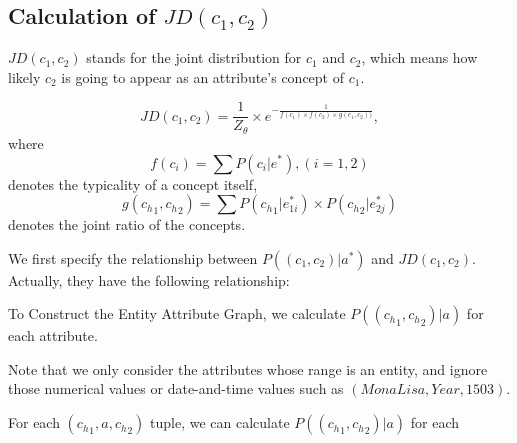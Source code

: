 



\subsection{ Calculation of $JD(c_1,c_2)$}


$JD(c_1,c_2)$ stands for the joint distribution for $c_1$ and $c_2$, which means how likely $c_2$ is going to appear as an attribute's concept of $c_1$.

\begin{definition}[Definition of $JD(c_1,c_2)$]

  $$ JD(c_1,c_2) = \frac{1}{Z_\theta}\times e^{- \frac{1}{f(c_1)\times f(c_2)\times g(c_1,c_2))}},$$
  where $$f(c_i)=\sum{ P(c_i|e^*) },(i=1,2)$$
  denotes the typicality of a concept itself, $$g({c_h}_1 ,{c_h}_2 )=\sum P({c_h}_{1}|e_{1i}^*) \times P({c_h}_{2}|e_{2j}^*)$$
  denotes the joint ratio of the concepts.


\end{definition}





We first specify the relationship between $P((c_{1},c_{2})|a^*) $ and $JD(c_1,c_2)$. Actually, they have the following relationship:
\xch{===========================}



To Construct the Entity Attribute Graph, we calculate $P(({c_h}_{1},{c_h}_{2}) |a)$ for each attribute.




Note that we only consider the attributes whose range is an entity, and ignore those numerical values or date-and-time values such as $( Mona Lisa, Year, 1503)$.





For each $({c_h}_{1},a,{c_h}_{2})$ tuple, we can calculate $P(({c_h}_{1},{c_h}_{2}) |a)$ for each










